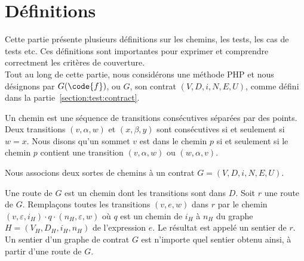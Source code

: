 \section{Définitions}
\label{section:test:definitions}

Cette partie présente plusieurs définitions sur les chemins, les tests, les cas
de tests etc. Ces définitions sont importantes pour exprimer et comprendre
correctment les critères de couverture. \\

Tout au long de cette partie, nous considérons une méthode PHP  et nous
désignons par $G(\code{f})$, ou $G$, son contrat $(V, D, i, N, E, U)$, comme
défini dans la partie~\ref{section:test:contract}.

\begin{definition}

Un {\strong chemin} est une séquence de transitions consécutives séparées par
des points. Deux transitions $(v, \alpha, w)$ et $(x, \beta, y)$ sont
consécutives si et seulement si $w = x$. Nous disons qu'un sommet $v$ {\strong
est dans} le chemin $p$ si et seulement si le chemin $p$ contient une transition
$(v, \alpha, w)$ ou $(w, \alpha, v)$.

\end{definition}

Nous associons deux sortes de chemins à un contrat $G = (V, D, i, N, E, U)$.

\begin{definition}

Une {\strong route} de $G$ est un chemin dont les transitions sont dans $D$.
Soit $r$ une route de $G$. Remplaçons toutes les transitions $(v, e, w)$ dans
$r$ par le chemin $(v, \varepsilon, i_H) \cdot q \cdot (n_H, \varepsilon, w)$ où
$q$ est un chemin de $i_H$ à $n_H$ du graphe $H = (V_H, D_H, i_H, n_H)$ de
l'expression $e$. Le résultat est appelé un {\strong sentier} de $r$. Un sentier
d'un graphe de contrat $G$ est n'importe quel sentier obtenu ainsi, à partir
d'une route de $G$.

\end{definition}

